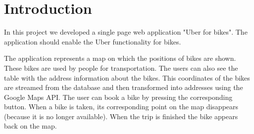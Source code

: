 \section{Introduction}

In this project we developed a single page web application "Uber for bikes". The application should enable the Uber functionality for bikes. 

The application represents a map on which the positions of bikes are shown. These bikes are used by people
for transportation. The users can also see the table with the address information about the bikes. This coordinates of the bikes are streamed from the database and then transformed into addresses using the Google Maps API. The user can book a bike by pressing the corresponding button. When a bike is taken, its corresponding point on the map disappears (because it is no longer available). When the trip is finished the bike appears back on the map. 